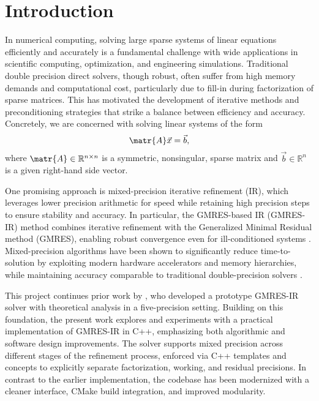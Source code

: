 \chapter{Introduction}
\label{cha:introduction}

In numerical computing, solving large sparse systems of linear equations
efficiently and accurately is a fundamental challenge with wide applications in
scientific computing, optimization, and engineering simulations. Traditional
double precision direct solvers, though robust, often suffer from high memory
demands and computational cost, particularly due to fill-in during factorization
of sparse matrices. This has motivated the development of iterative methods and
preconditioning strategies that strike a balance between efficiency and
accuracy. Concretely, we are concerned with solving linear systems of the
form \[\matr{A} \vec{x} = \vec{b}, \] where \(\matr{A} \in \mathbb{R}^{n \times
  n}\) is a symmetric, nonsingular, sparse matrix and \(\vec{b} \in
\mathbb{R}^n\) is a given right-hand side vector.

One promising approach is mixed-precision iterative refinement (IR), which
leverages lower precision arithmetic for speed while retaining high precision
steps to ensure stability and accuracy. In particular, the GMRES-based IR
(GMRES-IR) method combines iterative refinement with the Generalized Minimal
Residual method (GMRES), enabling robust convergence even for ill-conditioned
systems \cite{lindquist_improving_2020,mary_mixed_2023}. Mixed-precision
algorithms have been shown to significantly reduce time-to-solution by
exploiting modern hardware accelerators and memory hierarchies, while
maintaining accuracy comparable to traditional double-precision solvers
\cite{mary_mixed_2023}.

This project continues prior work by \textcite{wong_exploring_2024}, who developed
a prototype GMRES-IR solver with theoretical analysis in a five-precision
setting. Building on this foundation, the present work explores and experiments
with a practical implementation of GMRES-IR in C++, emphasizing both algorithmic
and software design improvements. The solver supports mixed precision across
different stages of the refinement process, enforced via C++ templates and
concepts to explicitly separate factorization, working, and residual precisions.
In contrast to the earlier implementation, the codebase has been modernized with
a cleaner interface, CMake build integration, and improved modularity.


